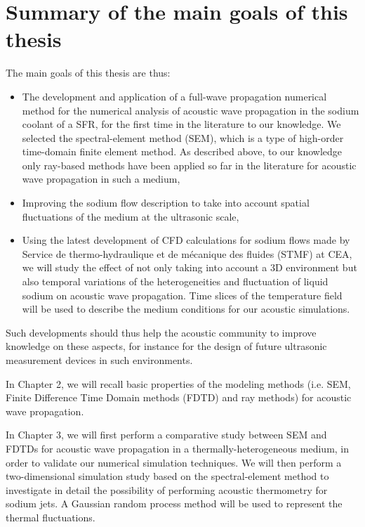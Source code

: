 \section{Summary of the main goals of this thesis} \label{sec:goals}

    The main goals of this thesis are thus:
    \begin{itemize}
        \item The development and application of a full-wave propagation numerical method for the numerical analysis of acoustic wave propagation in the sodium coolant of a SFR,
for the first time in the literature to our knowledge. We selected the spectral-element method (SEM), which is a type of high-order time-domain finite element method.
As described above, to our knowledge only ray-based methods have been applied so far in the literature for acoustic wave propagation in such a medium,

        \item Improving the sodium flow description to take into account spatial fluctuations of the medium at the ultrasonic scale,

        \item Using the latest development of CFD calculations for sodium flows made by Service de thermo-hydraulique et de m\'ecanique des fluides (STMF) at CEA, we will study the effect of not only taking into account a 3D environment but also
temporal variations of the heterogeneities and fluctuation of liquid sodium on acoustic wave propagation. Time slices of the temperature field will be
used to describe the medium conditions for our acoustic simulations.
    \end{itemize}
     Such developments should thus help the acoustic community to improve knowledge on these aspects, for instance for the design of future ultrasonic measurement devices in such environments.

    In Chapter 2, we will recall basic properties of the modeling methods (i.e. SEM, Finite Difference Time Domain methods (FDTD) and ray methods) for acoustic
wave propagation.

    In Chapter 3, we will first perform a comparative study between SEM and FDTDs for acoustic wave propagation in a thermally-heterogeneous medium, in order
to validate our numerical simulation techniques. We will then perform a two-dimensional simulation study based on the spectral-element method
to investigate in detail the possibility of performing acoustic thermometry for sodium jets.
A Gaussian random process method will be used to represent the thermal fluctuations.

